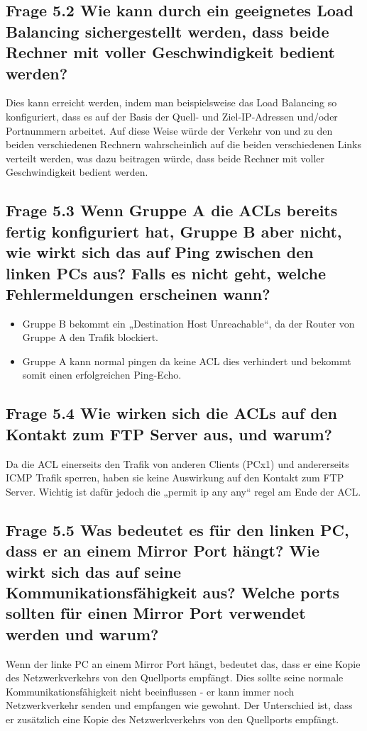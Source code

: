 \documentclass{article}
\begin{document}
\subsection*{Frage 5.2 \normalfont Wie kann durch ein geeignetes Load Balancing sichergestellt werden, dass beide Rechner mit voller Geschwindigkeit bedient werden?}
Dies kann erreicht werden, indem man beispielsweise das Load Balancing so konfiguriert, dass es auf der Basis der Quell- und Ziel-IP-Adressen und/oder Portnummern arbeitet. Auf diese Weise würde der Verkehr von und zu den beiden verschiedenen Rechnern wahrscheinlich auf die beiden verschiedenen Links verteilt werden, was dazu beitragen würde, dass beide Rechner mit voller Geschwindigkeit bedient werden.\\

\subsection*{Frage 5.3 \normalfont Wenn Gruppe A die ACLs bereits fertig konfiguriert hat, Gruppe B aber nicht, wie wirkt sich das auf Ping zwischen den linken PCs aus? Falls es nicht geht, welche Fehlermeldungen erscheinen wann?}

\begin{itemize}
  \item Gruppe B bekommt ein „Destination Host Unreachable“, da der Router von Gruppe A den Trafik blockiert.
  \item Gruppe A kann normal pingen da keine ACL dies verhindert und bekommt somit einen erfolgreichen Ping-Echo.
\end{itemize}
\subsection*{Frage 5.4 \normalfont Wie wirken sich die ACLs auf den Kontakt zum FTP Server aus, und warum?} 
Da die ACL einerseits den Trafik von anderen Clients (PCx1) und andererseits ICMP Trafik sperren, haben sie keine Auswirkung auf den Kontakt zum FTP Server. Wichtig ist dafür jedoch die „permit ip any any“ regel am Ende der ACL.\\

\subsection*{Frage 5.5 \normalfont Was bedeutet es für den linken PC, dass er an einem Mirror Port hängt? Wie wirkt sich das auf seine Kommunikationsfähigkeit aus? Welche ports sollten für einen Mirror Port verwendet werden und warum?}
Wenn der linke PC an einem Mirror Port hängt, bedeutet das, dass er eine Kopie des Netzwerkverkehrs von den Quellports empfängt. Dies sollte seine normale Kommunikationsfähigkeit nicht beeinflussen - er kann immer noch Netzwerkverkehr senden und empfangen wie gewohnt. Der Unterschied ist, dass er zusätzlich eine Kopie des Netzwerkverkehrs von den Quellports empfängt.\\
\end{document}
